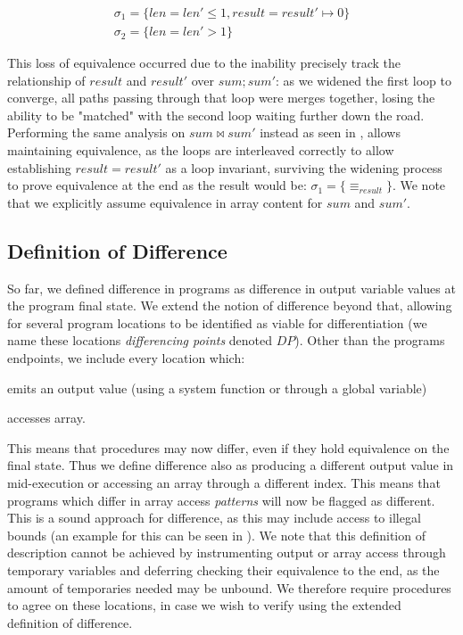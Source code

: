 {\footnotesize
\[
\begin{array}{c}
\sigma_1 = \{len = len' \leq 1, result = result' \mapsto 0\} \\
\sigma_2 = \{len = len' > 1\}
\end{array}
\]
}


This loss of equivalence occurred due to the inability precisely track the relationship of $result$ and $result'$ over $sum;sum'$: as we widened the first loop to converge, all paths passing through that loop were merges together, losing the ability to be "matched" with the second loop waiting further down the road. Performing the same analysis on $sum \bowtie sum'$ instead as seen in , allows maintaining equivalence, as the loops are interleaved correctly to allow establishing $result = result'$ as a loop invariant, surviving the widening process to prove equivalence at the end as the result would be:
{\footnotesize $\sigma_1 = \{\equiv_{result}\}$}. We note that we explicitly assume equivalence in array content for $sum$ and $sum'$.

\subsection{Definition of Difference} 
So far, we defined difference in programs as difference in output variable values at the program final state. We extend the notion of difference beyond that, allowing for several program locations to be identified as viable for differentiation (we name these locations \emph{differencing points} denoted $DP$). Other than the programs endpoints, we include every location which:
\begin{inparaenum}[(i)]
\item emits an output value (using a system function or through a global variable)
\item accesses array.
\end{inparaenum}
This means that procedures may now differ, even if they hold equivalence on the final state. Thus we define difference also as producing a different output value in mid-execution or accessing an array through a different index. This means that programs which differ in array access \emph{patterns} will now be flagged as different. This is a sound approach for difference, as this may include access to illegal bounds (an example for this can be seen in ). We note that this definition of description cannot be achieved by instrumenting output or array access through temporary variables and deferring checking their equivalence to the end, as the amount of temporaries needed may be unbound. We therefore require procedures to agree on these locations, in case we wish to verify using the extended definition of difference. 